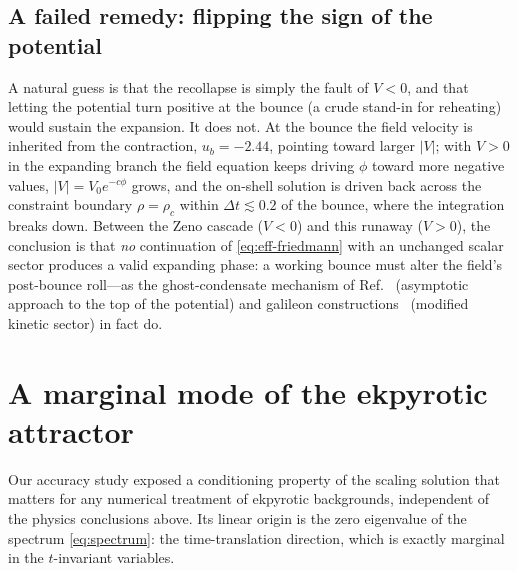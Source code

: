 \documentclass[11pt,a4paper]{article}
\newcommand{\rhoc}{\rho_c}
\begin{document}
\subsection{A failed remedy: flipping the sign of the potential}
\label{sec:vflip}

A natural guess is that the recollapse is simply the fault of $V<0$, and
that letting the potential turn positive at the bounce (a crude stand-in
for reheating) would sustain the expansion. It does not. At the bounce the
field velocity is inherited from the contraction, $u_b=-2.44$, pointing
toward larger $|V|$; with $V>0$ in the expanding branch the field equation
keeps driving $\phi$ toward more negative values, $|V|=V_0e^{-c\phi}$
grows, and the on-shell solution is driven back across the constraint
boundary $\rho=\rhoc$ within $\Delta t\lesssim0.2$ of the bounce, where the
integration breaks down. Between the Zeno cascade ($V<0$) and this
runaway ($V>0$), the conclusion is that \emph{no} continuation of
\eqref{eq:eff-friedmann} with an unchanged scalar sector produces a valid
expanding phase: a working bounce must alter the field's post-bounce
roll---as the ghost-condensate mechanism of Ref.~\cite{Buchbinder:2007ad}
(asymptotic approach to the top of the potential) and galileon
constructions~\cite{Easson:2011zy} (modified kinetic sector) in fact do.

\section{A marginal mode of the ekpyrotic attractor}
\label{sec:marginal}

Our accuracy study exposed a conditioning property of the scaling solution
that matters for any numerical treatment of ekpyrotic backgrounds,
independent of the physics conclusions above. Its linear origin is the zero
eigenvalue of the spectrum \eqref{eq:spectrum}: the time-translation
direction, which is exactly marginal in the $t$-invariant variables.
\end{document}

